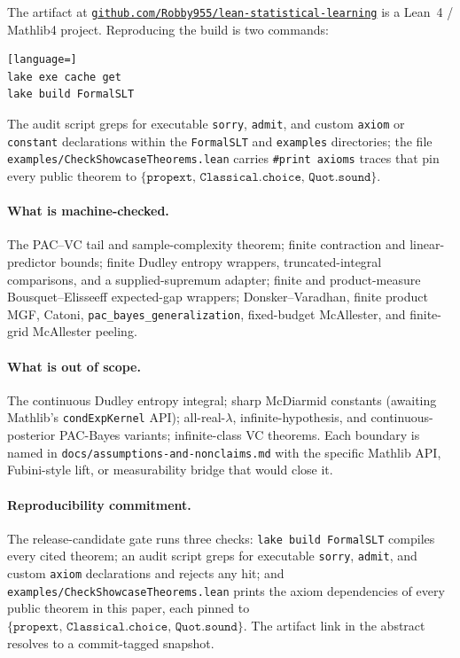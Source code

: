 \documentclass[10pt,twocolumn,letterpaper]{article}
\begin{document}
The artifact at
\href{https://github.com/Robby955/lean-statistical-learning}{\nolinkurl{github.com/Robby955/lean-statistical-learning}}
is a Lean~4 / Mathlib4 project. Reproducing the build is two commands:

\begin{lstlisting}[language=]
lake exe cache get
lake build FormalSLT
\end{lstlisting}

\noindent
The audit script greps for executable \texttt{sorry}, \texttt{admit},
and custom \texttt{axiom} or \texttt{constant} declarations within the
\texttt{FormalSLT} and \texttt{examples} directories; the file
\texttt{examples/CheckShowcaseTheorems.lean} carries
\texttt{\#print axioms} traces that pin every public theorem to
$\{\texttt{propext},\,\texttt{Classical.choice},\,\texttt{Quot.sound}\}$.

\paragraph{What is machine-checked.}
The PAC--VC tail and sample-complexity theorem; finite contraction and
linear-predictor bounds; finite Dudley entropy wrappers, truncated-integral
comparisons, and a supplied-supremum adapter; finite and product-measure
Bousquet--Elisseeff expected-gap wrappers; Donsker--Varadhan, finite product
MGF, Catoni, \texttt{pac\_bayes\_generalization}, fixed-budget McAllester, and
finite-grid McAllester peeling.

\paragraph{What is out of scope.}
The continuous Dudley entropy integral; sharp McDiarmid constants
(awaiting Mathlib's \texttt{condExpKernel} API); all-real-$\lambda$,
infinite-hypothesis, and continuous-posterior PAC-Bayes variants;
infinite-class VC theorems. Each boundary is named in
\texttt{docs/assumptions-and-nonclaims.md} with the specific
Mathlib API, Fubini-style lift, or measurability bridge that would
close it.

\paragraph{Reproducibility commitment.}
The release-candidate gate runs three checks: \texttt{lake build
FormalSLT} compiles every cited theorem; an audit script greps for
executable \texttt{sorry}, \texttt{admit}, and custom \texttt{axiom}
declarations and rejects any hit; and
\texttt{examples/CheckShowcaseTheorems.lean} prints the axiom
dependencies of every public theorem in this paper, each pinned to
$\{\texttt{propext},\,\texttt{Classical.choice},\,\texttt{Quot.sound}\}$.
The artifact link in the abstract resolves to a commit-tagged
snapshot.

{\small


}
\end{document}

